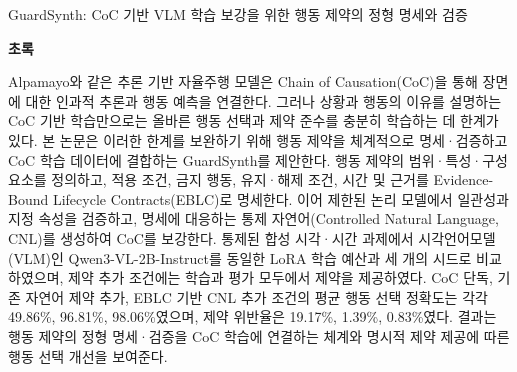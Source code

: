 \documentclass[11pt,a4paper]{article}
\begin{document}
\vspace*{8mm}
{\Large\bfseries\color{navy}\raggedright GuardSynth: CoC 기반 VLM 학습 보강을 위한 행동 제약의 정형 명세와 검증\par}
\vspace{8mm}
{\large\bfseries 초록\par}
\vspace{3mm}
Alpamayo와 같은 추론 기반 자율주행 모델은 Chain of Causation(CoC)을 통해 장면에 대한 인과적 추론과 행동 예측을 연결한다. 그러나 상황과 행동의 이유를 설명하는 CoC 기반 학습만으로는 올바른 행동 선택과 제약 준수를 충분히 학습하는 데 한계가 있다. 본 논문은 이러한 한계를 보완하기 위해 행동 제약을 체계적으로 명세·검증하고 CoC 학습 데이터에 결합하는 GuardSynth를 제안한다. 행동 제약의 범위·특성·구성 요소를 정의하고, 적용 조건, 금지 행동, 유지·해제 조건, 시간 및 근거를 Evidence-Bound Lifecycle Contracts(EBLC)로 명세한다. 이어 제한된 논리 모델에서 일관성과 지정 속성을 검증하고, 명세에 대응하는 통제 자연어(Controlled Natural Language, CNL)를 생성하여 CoC를 보강한다. 통제된 합성 시각·시간 과제에서 시각언어모델(VLM)인 Qwen3-VL-2B-Instruct를 동일한 LoRA 학습 예산과 세 개의 시드로 비교하였으며, 제약 추가 조건에는 학습과 평가 모두에서 제약을 제공하였다. CoC 단독, 기존 자연어 제약 추가, EBLC 기반 CNL 추가 조건의 평균 행동 선택 정확도는 각각 49.86\%, 96.81\%, 98.06\%였으며, 제약 위반율은 19.17\%, 1.39\%, 0.83\%였다. 결과는 행동 제약의 정형 명세·검증을 CoC 학습에 연결하는 체계와 명시적 제약 제공에 따른 행동 선택 개선을 보여준다.
\clearpage
\end{document}
